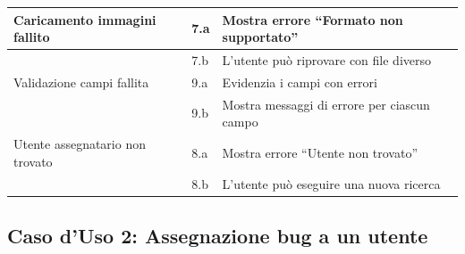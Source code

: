 \begin{longtable}{|p{3cm}|p{7cm}|p{5.5cm}|}
Caricamento immagini fallito & 7.a & Mostra errore ``Formato non supportato'' \\
\hline
 & 7.b & L'utente può riprovare con file diverso \\
\hline
Validazione campi fallita & 9.a & Evidenzia i campi con errori \\
\hline
 & 9.b & Mostra messaggi di errore per ciascun campo \\
\hline
Utente assegnatario non trovato & 8.a & Mostra errore ``Utente non trovato'' \\
\hline
 & 8.b & L'utente può eseguire una nuova ricerca \\
\hline
\end{longtable}

\subsection{Caso d'Uso 2: Assegnazione bug a un utente}

